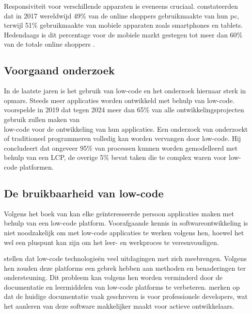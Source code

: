 \vspace{\baselineskip}

Responsiviteit voor verschillende apparaten is eveneens cruciaal. \textcite{wagner2020online} constateerden dat in 2017 wereldwijd 49\% van de online shoppers gebruikmaakte van hun pc, terwijl 51\% gebruikmaakte van mobiele apparaten zoals smartphones en tablets. Hedendaags is dit percentage voor de mobiele markt gestegen tot meer dan 60\% van de totale online shoppers \autocite{Seitz2024}.

\subsection{Voorgaand onderzoek}
\label{sec:Voorgaand onderzoek}

In de laatste jaren is het gebruik van low-code en het onderzoek hiernaar sterk in opmars. Steeds meer applicaties worden ontwikkeld met behulp van low-code. \textcite{GartnerResearch2019} voorspelde in 2019 dat tegen 2024 meer dan 65\% van alle ontwikkelingsprojecten gebruik zullen maken van \\low-code voor de ontwikkeling van hun applicaties. Een onderzoek van \textcite{VanMullem2022} onderzoekt of traditioneel programmeren volledig kan worden vervangen door low-code. Hij concludeert dat ongeveer 95\% van processen kunnen worden gemodelleerd met behulp van een LCP, de overige 5\% bevat taken die te complex waren voor low-code platformen.

\subsection{De bruikbaarheid van low-code}
\label{sec:De bruikbaarheid van low-code}

Volgens het boek van \textcite{kenneweg2021building} kan elke geïnteresseerde persoon applicaties maken met behulp van een low-code platform. Voorafgaande kennis in softwareontwikkeling is niet noodzakelijk om met low-code applicaties te werken volgens hen, hoewel het wel een pluspunt kan zijn om het leer- en werkproces te vereenvoudigen.

\vspace{\baselineskip}

\textcite{rokis2022challenges} stellen dat low-code technologieën veel uitdagingen met zich meebrengen. Volgens hen zouden deze platforms een gebrek hebben aan methoden en benaderingen ter ondersteuning. Dit probleem kan volgens hen worden verminderd door de documentatie en leermiddelen van low-code platforms te verbeteren. \textcite{bernsteiner2022citizen} merken op dat de huidige documentatie vaak geschreven is voor professionele developers, wat het aanleren van deze software makkelijker maakt voor actieve ontwikkelaars.